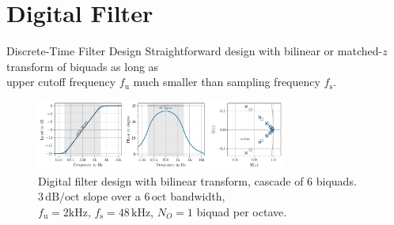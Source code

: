 \documentclass[mathserif,aspectratio=169]{beamer}
\newcommand{\tw}{0.73}
\begin{document}
\section{Digital Filter}
\begin{frame}{Discrete-Time Filter Design}
Straightforward design with bilinear or matched-$z$ transform of biquads
as long as\\
upper cutoff frequency $f_\mathrm{u}$ much smaller than sampling frequency $f_\mathrm{s}$.
\begin{figure}
\captionsetup{width=.6\linewidth}
\includegraphics[width=\tw\textwidth]{../graphics/digital-3db-per-octave-shelving-filter_slides.pdf}
\caption{Digital filter design with bilinear transform, cascade of 6 biquads.\\
$3\,\mathrm{dB/oct}$ slope over a $6\,\mathrm{oct}$ bandwidth,\\
$f_\mathrm{u}=2\mathrm{kHz}$, $f_\mathrm{s}=48\,\mathrm{kHz}$, $N_O=1$ biquad per
octave.}
\label{fig:digital-3db-per-octave-shelving-filter}
\end{figure}
\end{frame}
\end{document}
